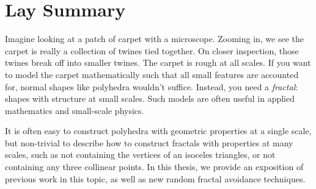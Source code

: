 


\chapter{Lay Summary}

Imagine looking at a patch of carpet with a microscope. Zooming in, we see the carpet is really a collection of twines tied together. On closer inspection, those twines break off into smaller twines. The carpet is rough at all scales. If you want to model the carpet mathematically such that all small features are accounted for, normal shapes like polyhedra wouldn't suffice. Instead, you need a \emph{fractal}: shapes with structure at small scales. Such models are often useful in applied mathematics and small-scale physics.

It is often easy to construct polyhedra with geometric properties at a single scale, but non-trivial to describe how to construct fractals with properties at many scales, such as not containing the vertices of an isoceles triangles, or not containing any three collinear points. In this thesis, we provide an exposition of previous work in this topic, as well as new random fractal avoidance techniques.